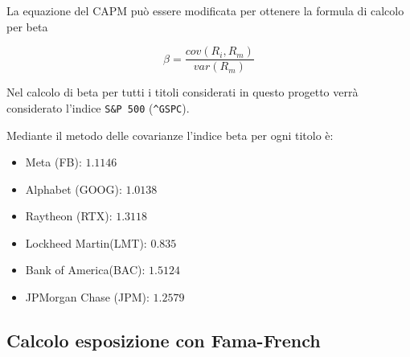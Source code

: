 La equazione del CAPM può essere modificata per ottenere la formula di calcolo per beta

\begin{displaymath}
    \beta = \frac{cov(R_i,R_m)}{var(R_m)}
\end{displaymath}

Nel calcolo di beta per tutti i titoli considerati in questo progetto verrà considerato l'indice \verb|S&P 500| (\verb|^GSPC|).

Mediante il metodo delle covarianze l'indice beta per ogni titolo è:
\begin{itemize}
    \item Meta (FB): $1.1146$
    \item Alphabet (GOOG): $1.0138$
    \item Raytheon (RTX): $1.3118$
    \item Lockheed Martin(LMT): $0.835$
    \item Bank of America(BAC): $1.5124$
    \item JPMorgan Chase (JPM): $1.2579$
\end{itemize}

\pagebreak

\subsection{Calcolo esposizione con Fama-French}


